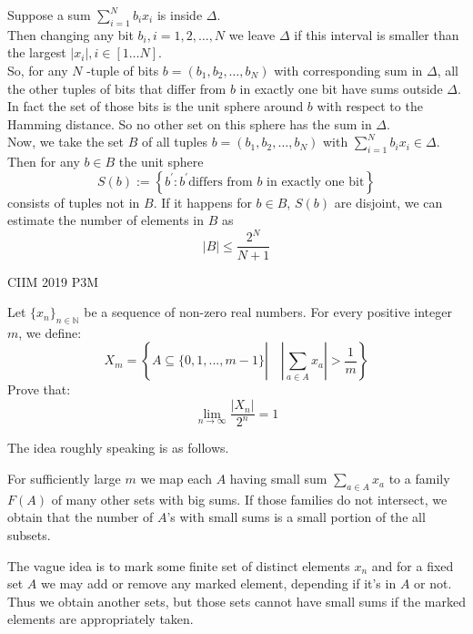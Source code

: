 \begin{solution}
    Suppose a sum $\sum_{i=1}^{N} b_{i} x_{i}$ is inside $\Delta$. \\

    Then changing any bit $b_{i}, i=1,2, \ldots, N$ we leave $\Delta$ if this
    interval is smaller than the largest $\left|x_{i}\right|, i \in[1 \ldots
    N]$.\\

    So, for any $N$ -tuple of bits $b=\left(b_{1}, b_{2}, \ldots,
    b_{N}\right)$ with corresponding sum in $\Delta$, all the other tuples of
    bits that differ from $b$ in exactly one bit have sums outside $\Delta$.\\

    In fact the set of those bits is the unit sphere around $b$ with respect
    to the Hamming distance. So no other set on this sphere has the sum in
    $\Delta$.\\

    Now, we take the set $B$ of all tuples $b=\left(b_{1}, b_{2}, \ldots,
    b_{N}\right)$ with $\sum_{i=1}^{N} b_{i} x_{i} \in \Delta$. Then for any $b
    \in B$ the unit sphere 
    {\color{solC} \[S(b):=\left\{b^{\prime}: b^{\prime} \text{differs from } b
    \text{ in exactly one bit}\right\}\]}
    consists of tuples not in $B$. If it happens for $b \in B$, $S(b)$ are
    disjoint, we can estimate the number of elements in $B$ as
    \[ |B| \leq \frac{2^{N}}{N+1} \]
\end{solution}

\newpage
{}
{CIIM 2019 P3}{M}{
    Let $\{x_n\}_{n\in{}\mathbb{N}}$ be a sequence of non-zero real numbers.
    For every positive integer $m$, we define:
    \[X_m=\left\{A\subseteq{}\{0,1,...,m-1\}\left|\quad\left|\sum_{a\in{A}}
    x_a\right| >\frac{1}{m}\right.\right\}\]
    Prove that: \[\lim_{n\to\infty} \frac{\vert{}X_n\vert{}}{2^n}=1\]

}

\begin{Remark}
    The idea roughly speaking is as follows.

    {\color{impC}For sufficiently large $m$ we map each $A$ having small sum $\sum_{a\in
    A}x_a$ to a family $F(A)$ of many other sets with big sums.} If those
    families do not intersect, we obtain that the number of $A$'s with small
    sums is a small portion of the all subsets. 

    The vague idea is to mark some finite set of distinct elements
    $x_n$ and for a fixed set $A$ we may add or remove any marked element,
    depending if it's in $A$ or not. Thus we obtain another sets, but those
    sets cannot have small sums if the marked elements are appropriately
    taken.
\end{Remark}


